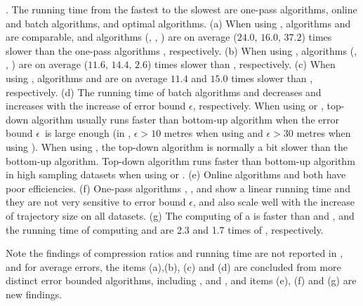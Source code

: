 {\emph{}. The running time from the fastest to the slowest are one-pass algorithms, online and batch algorithms, and optimal algorithms.
(a) When using \ped, algorithms \siped and \operb are comparable, and algorithms
(\tpa, \dpa, \bqsa) are on average ($24.0$, $16.0$, $37.2$) times slower than the one-pass algorithms \siped, respectively.
(b) When using \sed, algorithms (\tpa, \dpa, \squishe) are on average ($11.6$, $14.4$, $2.6$) times slower than \cised, respectively.
(c) When using \dad, algorithms \tpa and \dpa are on average
$11.4$ and $15.0$ times slower than \ridad, respectively.
(d) The running time of batch algorithms \dpa and \tpa decreases and increases with the increase of error bound $\epsilon$, respectively. When using \ped or \sed, top-down algorithm \dpa usually runs faster than bottom-up algorithm \tpa when the error bound $\epsilon$~is large enough (\eg in \geolife, $\epsilon >10$ metres when using \ped and $\epsilon >30$ metres when using \sed). When using \dad, the top-down algorithm is normally a bit slower than the bottom-up algorithm.
Top-down algorithm runs faster than bottom-up algorithm in high sampling datasets when using \ped or \sed.
(e) Online algorithms \bqsa and \opwa both have poor efficiencies.
(f) One-pass algorithms \operb, \siped, \cised and \ridad show a linear running time and they are not very sensitive to error bound $\epsilon$, and also scale well with the increase of trajectory size on all datasets.
(g) The computing of a \dad is faster than \ped and \sed, and the running time of computing \ped and \sed are 2.3 and 1.7 times of \dad, respectively.

Note the findings of compression ratios and running time are not reported in \cite{Zhang:Evaluation}, and for average errors, the items (a),(b), (c) and (d) are concluded from more distinct error bounded \lsa algorithms, including \opt, \siped and \cised, and items (e), (f) and (g) are new findings.
}




